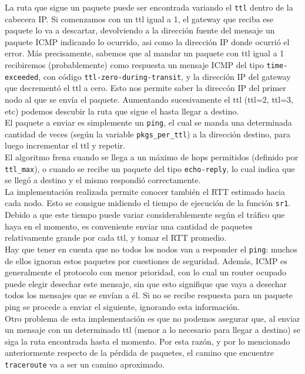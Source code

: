  La ruta que sigue un paquete puede ser encontrada variando el \texttt{ttl} dentro de la cabecera IP. Si comenzamos con un ttl igual a 1, el gateway que reciba ese paquete lo va a descartar, devolviendo a la direcci\'on fuente del mensaje un paquete ICMP indicando lo ocurrido, asi como la direcci\'on IP donde ocurri\'o el error. M\'as precisamente, sabemos que al mandar un paquete con ttl igual a 1 recibiremos (probablemente) como respuesta un mensaje ICMP del tipo \texttt{time-exceeded}, con c\'odigo \texttt{ttl-zero-during-transit}, y la direcci\'on IP del gateway que decrement\'o el ttl a cero. Esto nos permite saber la direcc\'on IP del primer nodo al que se env\'ia el paquete. Aumentando sucesivamente el ttl (ttl=2, ttl=3, etc) podemos descubir la ruta que sigue el hasta llegar a destino.\\
 
 El paquete a enviar es simplemente un \texttt{ping}, el cual se manda una determinada cantidad de veces (seg\'un la variable \texttt{pkgs\_per\_ttl}) a la direcci\'on destino, para luego incrementar el ttl y repetir.\\
 
 El algoritmo frena cuando se llega a un m\'aximo de hops permitidos (definido por \texttt{ttl\_max}), o cuando se recibe un paquete del tipo \texttt{echo-reply}, lo cual indica que se lleg\'o a destino y el mismo respondi\'o correctamente.\\
 
 La implementaci\'on realizada permite conocer tambi\'en el RTT estimado hacia cada nodo. Esto se consigue midiendo el tiempo de ejecuci\'on de la funci\'on \texttt{sr1}. Debido a que este tiempo puede variar considerablemente seg\'un el tr\'afico que haya en el momento, es conveniente enviar una cantidad de paquetes relativamente grande por cada ttl, y tomar el RTT promedio.\\
 
 Hay que tener en cuenta que no todos los nodos van a responder el \texttt{ping}: muchos de ellos ignoran estos paquetes por cuestiones de seguridad. Adem\'as, ICMP es generalmente el protocolo con menor prioridad, con lo cual un router ocupado puede elegir desechar este mensaje, sin que esto signifique que vaya a desechar todos los mensajes que se env\'ian a \'el. Si no se recibe respuesta para un paquete ping se procede a enviar el siguiente, ignorando esta informaci\'on.\\
 
 Otro problema de esta implementaci\'on es que no podemos asegurar que, al enviar un mensaje con un determinado ttl (menor a lo necesario para llegar a destino) se siga la ruta encontrada hasta el momento. Por esta raz\'on, y por lo mencionado anteriormente respecto de la p\'erdida de paquetes, el camino que encuentre \texttt{traceroute} va a ser un camino aproximado. \\
 
